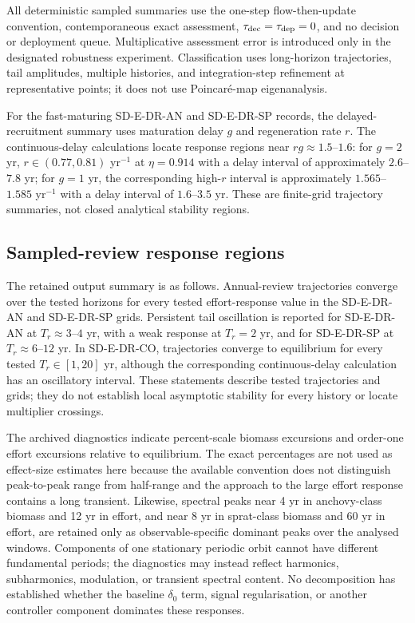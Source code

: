 \documentclass[11pt]{article}
\begin{document}
All deterministic sampled summaries use the one-step flow-then-update convention, contemporaneous exact assessment, $\tau_{\rm dec}=\tau_{\rm dep}=0$, and no decision or deployment queue. Multiplicative assessment error is introduced only in the designated robustness experiment. Classification uses long-horizon trajectories, tail amplitudes, multiple histories, and integration-step refinement at representative points; it does not use Poincar\'e-map eigenanalysis.

For the fast-maturing SD-E-DR-AN and SD-E-DR-SP records, the delayed-recruitment summary uses maturation delay $g$ and regeneration rate $r$. The continuous-delay calculations locate response regions near $rg\approx1.5$--$1.6$: for $g=2$ yr, $r\in(0.77,0.81)$ yr$^{-1}$ at $\eta=0.914$ with a delay interval of approximately $2.6$--$7.8$ yr; for $g=1$ yr, the corresponding high-$r$ interval is approximately $1.565$--$1.585$ yr$^{-1}$ with a delay interval of $1.6$--$3.5$ yr. These are finite-grid trajectory summaries, not closed analytical stability regions.

\subsection{Sampled-review response regions}

The retained output summary is as follows. Annual-review trajectories converge over the tested horizons for every tested effort-response value in the SD-E-DR-AN and SD-E-DR-SP grids. Persistent tail oscillation is reported for SD-E-DR-AN at $T_r\approx3$--$4$ yr, with a weak response at $T_r=2$ yr, and for SD-E-DR-SP at $T_r\approx6$--$12$ yr. In SD-E-DR-CO, trajectories converge to equilibrium for every tested $T_r\in[1,20]$ yr, although the corresponding continuous-delay calculation has an oscillatory interval. These statements describe tested trajectories and grids; they do not establish local asymptotic stability for every history or locate multiplier crossings.

The archived diagnostics indicate percent-scale biomass excursions and order-one effort excursions relative to equilibrium. The exact percentages are not used as effect-size estimates here because the available convention does not distinguish peak-to-peak range from half-range and the approach to the large effort response contains a long transient. Likewise, spectral peaks near 4 yr in anchovy-class biomass and 12 yr in effort, and near 8 yr in sprat-class biomass and 60 yr in effort, are retained only as observable-specific dominant peaks over the analysed windows. Components of one stationary periodic orbit cannot have different fundamental periods; the diagnostics may instead reflect harmonics, subharmonics, modulation, or transient spectral content. No decomposition has established whether the baseline $\delta_0$ term, signal regularisation, or another controller component dominates these responses.
\end{document}
